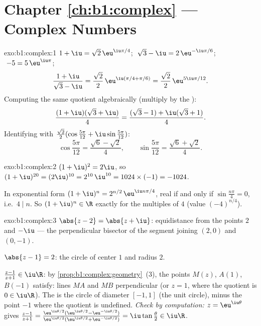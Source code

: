 \section*{Chapter \ref{ch:b1:complex} --- Complex Numbers}

\begin{solution}{exo:b1:complex:1}
$1 + \iu = \sqrt 2\, \eu^{\iu\pi/4}$;
$\;\sqrt 3 - \iu = 2\, \eu^{-\iu\pi/6}$;
$\;-5 = 5\, \eu^{\iu\pi}$;
\[
\frac{1 + \iu}{\sqrt 3 - \iu}
= \frac{\sqrt 2}{2}\, \eu^{\iu(\pi/4 + \pi/6)}
= \frac{\sqrt 2}{2}\, \eu^{5\iu\pi/12}.
\]
Computing the same quotient algebraically (multiply by the ):
\[
\frac{(1 + \iu)(\sqrt 3 + \iu)}{4}
= \frac{(\sqrt 3 - 1) + \iu(\sqrt 3 + 1)}{4}.
\]
Identifying with $\frac{\sqrt 2}{2}(\cos\frac{5\pi}{12} +
\iu\sin\frac{5\pi}{12})$:
\[
\cos\frac{5\pi}{12} = \frac{\sqrt 6 - \sqrt 2}{4},
\qquad
\sin\frac{5\pi}{12} = \frac{\sqrt 6 + \sqrt 2}{4}.
\]
\end{solution}

\begin{solution}{exo:b1:complex:2}
$(1+\iu)^2 = 2\iu$, so $(1+\iu)^{20} = (2\iu)^{10} = 2^{10}\,\iu^{10}
= 1024 \times (-1) = -1024$.

In exponential form $(1+\iu)^n = 2^{n/2}\, \eu^{\iu n\pi/4}$, real if
and only if $\sin\frac{n\pi}{4} = 0$, i.e.\ $4 \mid n$. So $(1+\iu)^n
\in \R$ exactly for the multiples of $4$ (value $(-4)^{n/4}$).
\end{solution}

\begin{solution}{exo:b1:complex:3}
$\abs{z - 2} = \abs{z + \iu}$: equidistance from the points $2$ and
$-\iu$ --- the perpendicular bisector of the segment joining $(2, 0)$
and $(0, -1)$.

$\abs{z - 1} = 2$: the circle of center $1$ and radius $2$.

$\frac{z-1}{z+1} \in \iu\R$: by
\cref{prop:b1:complex:geometry}~(3), the points $M(z)$, $A(1)$,
$B(-1)$ satisfy: lines $MA$ and $MB$ perpendicular (or $z = 1$, where
the quotient is $0 \in \iu\R$). The  is the circle of diameter
$[-1, 1]$ (the unit circle), minus the point $-1$ where the quotient
is undefined. \emph{Check by computation:} $z = \eu^{\iu\theta}$ gives
$\frac{z-1}{z+1} = \frac{\eu^{\iu\theta/2}(\eu^{\iu\theta/2} -
\eu^{-\iu\theta/2})}{\eu^{\iu\theta/2}(\eu^{\iu\theta/2} +
\eu^{-\iu\theta/2})} = \iu\tan\frac\theta2 \in \iu\R$.
\end{solution}

